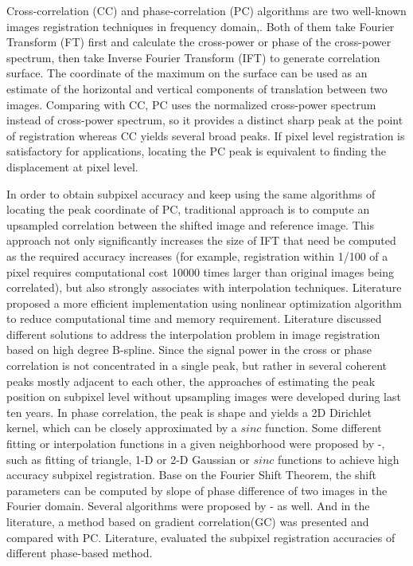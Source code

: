 \documentclass[conference]{IEEEtran}
\begin{document}
Cross-correlation (CC) and phase-correlation (PC) algorithms are two well-known images registration techniques in frequency domain\cite{cit:1},\cite{cit:3}. Both of them take Fourier Transform (FT) first and calculate the cross-power or phase of the cross-power spectrum, then take Inverse Fourier Transform (IFT) to generate correlation surface. The coordinate of the maximum on the surface can be used as an estimate of the horizontal and vertical components of translation between two images. Comparing with CC, PC uses the normalized cross-power spectrum instead of cross-power spectrum, so it provides a distinct sharp peak at the point of registration whereas CC yields several broad peaks\cite{cit:1}. If pixel level registration is satisfactory for applications, locating the PC peak is equivalent to finding the displacement at pixel level.

In order to obtain subpixel accuracy and keep using the same algorithms of locating the peak coordinate of PC, traditional approach is to compute an upsampled correlation between the shifted image and reference image. This approach not only significantly increases the size of IFT that need be computed as the required accuracy increases (for example, registration within 1/100 of a pixel requires computational cost 10000 times larger than original images being correlated), but also strongly associates with interpolation techniques\cite{cit:4}. Literature\cite{cit:5} proposed a more efficient implementation using nonlinear optimization algorithm to reduce computational time and memory requirement. Literature\cite{cit:6} discussed different solutions to address the interpolation problem in image registration based on high degree B-spline. Since the signal power in the cross or phase correlation is not concentrated in a single peak, but rather in several coherent peaks mostly adjacent to each other, the approaches of estimating the peak position on subpixel level without upsampling images were developed during last ten years. In phase correlation, the peak is shape and yields a 2D Dirichlet kernel, which can be closely approximated by a $sinc$ function. Some different fitting or interpolation functions in a given neighborhood were proposed by \cite{cit:7}-\cite{cit:10}, such as fitting of triangle, 1-D or 2-D Gaussian or $sinc$ functions to achieve high accuracy subpixel registration. Base on the Fourier Shift Theorem, the shift parameters can be computed by slope of phase difference of two images in the Fourier domain. Several algorithms were proposed by \cite{cit:11}-\cite{cit:14} as well. And in the literature\cite{cit:15}, a method based on gradient correlation(GC) was presented and compared with PC. Literature\cite{cit:11},\cite{cit:16} evaluated the subpixel registration accuracies of different phase-based method.
\end{document}
